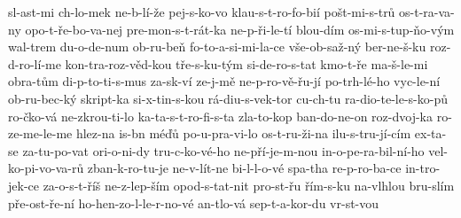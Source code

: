 sl-ast-mi
ch-lo-mek
ne-b-lí-že
pej-s-ko-vo
klau-s-t-ro-fo-bií
pošt-mi-s-trů
os-t-ra-va-ny
opo-t-ře-bo-va-nej
pre-mon-s-t-rát-ka
ne-p-ři-le-tí
blou-dím
os-mi-s-tup-ňo-vým
wal-trem
du-o-de-num
ob-ru-beň
fo-to-a-si-mi-la-ce
vše-ob-saž-ný
ber-ne-š-ku
roz-d-ro-lí-me
kon-tra-roz-věd-kou
tře-s-ku-tým
si-de-ro-s-tat
kmo-t-ře
ma-š-le-mi
obra-tům
di-p-to-ti-s-mus
za-sk-ví
ze-j-mě
ne-p-ro-vě-řu-jí
po-trh-lé-ho
vyc-le-ní
ob-ru-bec-ký
skript-ka
si-x-tin-s-kou
rá-diu-s-vek-tor
cu-ch-tu
ra-dio-te-le-s-ko-pů
ro-čko-vá
ne-zkrou-ti-lo
ka-ta-s-t-ro-fi-s-ta
zla-to-kop
ban-do-ne-on
roz-dvoj-ka
ro-ze-me-le-me
hlez-na
is-bn
méďů
po-u-pra-vi-lo
os-t-ru-ži-na
ilu-s-tru-jí-cím
ex-ta-se
za-tu-po-vat
ori-o-ni-dy
tru-c-ko-vé-ho
ne-pří-je-m-nou
in-o-pe-ra-bil-ní-ho
vel-ko-pi-vo-va-rů
zban-k-ro-tu-je
ne-v-lít-ne
bi-l-l-o-vé
spa-tha
re-p-ro-ba-ce
in-tro-jek-ce
za-o-s-t-říš
ne-z-lep-ším
opod-s-tat-nit
pro-st-řu
řím-s-ku
na-vlhlou
bru-slím
pře-ost-ře-ní
ho-hen-zo-l-le-r-no-vé
an-tlo-vá
sep-t-a-kor-du
vr-st-vou
